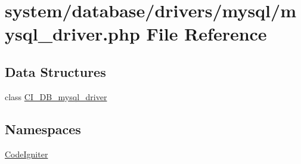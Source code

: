\hypertarget{mysql__driver_8php}{\section{system/database/drivers/mysql/mysql\-\_\-driver.php File Reference}
\label{mysql__driver_8php}
}
\subsection*{Data Structures}
\begin{DoxyCompactItemize}
\item 
class \hyperlink{class_c_i___d_b__mysql__driver}{C\-I\-\_\-\-D\-B\-\_\-mysql\-\_\-driver}
\end{DoxyCompactItemize}
\subsection*{Namespaces}
\begin{DoxyCompactItemize}
\item 
\hyperlink{namespace_code_igniter}{Code\-Igniter}
\end{DoxyCompactItemize}
